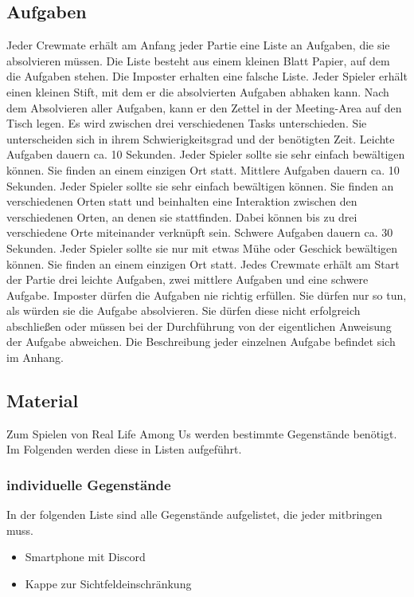 \subsection{Aufgaben}
Jeder Crewmate erhält am Anfang jeder Partie eine Liste an Aufgaben, die sie
absolvieren müssen. Die Liste besteht aus einem kleinen Blatt Papier, auf dem
die Aufgaben stehen.  Die Imposter erhalten eine falsche Liste.
Jeder Spieler erhält einen kleinen Stift, mit dem er die absolvierten Aufgaben
abhaken kann. Nach dem Absolvieren aller Aufgaben, kann er den Zettel in der
Meeting-Area auf den Tisch legen.
\newline
Es wird zwischen drei verschiedenen Tasks
unterschieden. Sie unterscheiden sich in ihrem Schwierigkeitsgrad und der
benötigten Zeit.
\newline
Leichte Aufgaben dauern ca. 10 Sekunden. Jeder Spieler sollte sie sehr einfach
bewältigen können. Sie finden an einem einzigen Ort statt.
\newline
Mittlere Aufgaben dauern ca. 10 Sekunden. Jeder Spieler sollte sie sehr einfach
bewältigen können. Sie finden an verschiedenen Orten statt und beinhalten
eine Interaktion zwischen den verschiedenen Orten, an denen sie stattfinden.
Dabei können bis zu drei verschiedene Orte miteinander verknüpft sein.
\newline
Schwere Aufgaben dauern ca. 30 Sekunden. Jeder Spieler sollte sie nur mit etwas
Mühe oder Geschick bewältigen können. Sie finden an einem einzigen Ort statt.
\newline
Jedes Crewmate erhält am Start der Partie drei leichte Aufgaben, zwei mittlere
Aufgaben und eine schwere Aufgabe.
\newline
Imposter dürfen die Aufgaben nie richtig erfüllen. Sie dürfen nur so tun, als
würden sie die Aufgabe absolvieren. Sie dürfen diese nicht erfolgreich
abschließen oder müssen bei der Durchführung von der eigentlichen Anweisung der
Aufgabe abweichen.
\newline
Die Beschreibung jeder einzelnen Aufgabe befindet sich im Anhang.

\newpage
\subsection{Material}
Zum Spielen von Real Life Among Us werden bestimmte Gegenstände benötigt. Im
Folgenden werden diese in Listen aufgeführt.
\subsubsection{individuelle Gegenstände}
In der folgenden Liste sind alle Gegenstände aufgelistet, die jeder mitbringen
muss.
\begin{itemize}
    \item Smartphone mit Discord
    \item Kappe zur Sichtfeldeinschränkung
\end{itemize}
\newpage

